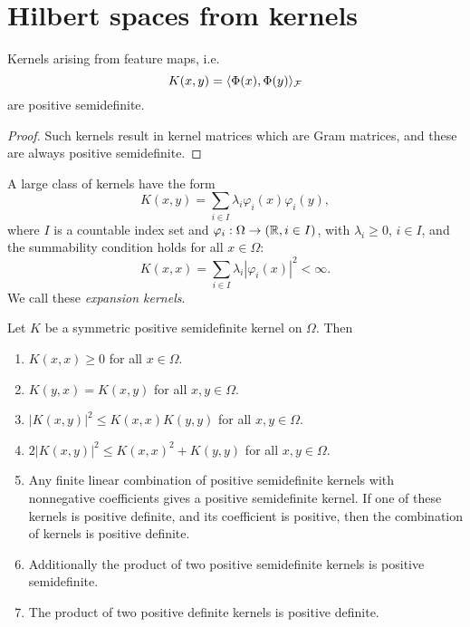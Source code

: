 \documentclass[../lecture-notes.tex]{subfiles}
\begin{document}
\section{Hilbert spaces from kernels} %
\begin{theorem} %
\label{thm:28}
Kernels arising from feature maps, i.e.
\[
	K(x, y) = \langle \Phi(x), \Phi(y) \rangle_{\mathcal{F}}
\]
are positive semidefinite.
\end{theorem}
\begin{proof}
Such kernels result in kernel matrices which are Gram matrices, and these are always positive semidefinite.
\end{proof}
\begin{remark}
A large class of kernels have the form
\[
	K(x, y) = \sum_{i \in I} \lambda_i \varphi_i(x) \varphi_i(y),
\]
where $I$ is a countable index set and $\varphi_i : \Omega \to (\mathbb{R}, i \in I)$, with $\lambda_i \geq 0$, $i \in I$, and the summability condition holds for all $x \in \Omega$:
\[
	K(x, x) = \sum_{i \in I} \lambda_i |\varphi_i(x)|^2 < \infty.
\]
We call these \emph{expansion kernels}.
\end{remark}
\begin{theorem} %
\label{thm:29}
Let $K$ be a symmetric positive semidefinite kernel on $\Omega$. Then
\begin{enumerate}
\item\label{thm:29-1}$K(x, x) \geq 0$ for all $x \in \Omega$.
\item\label{thm:29-2} $K(y, x) = K(x, y)$ for all $x, y \in \Omega$.
\item\label{thm:29-3} $|K(x, y)|^2 \leq K(x, x) K(y, y)$ for all $x, y \in \Omega$.
\item\label{thm:29-4} $2|K(x, y)|^2 \leq K(x, x)^2 + K(y, y)$ for all $x, y \in \Omega$.
\item\label{thm:29-5} Any finite linear combination of positive semidefinite kernels with nonnegative coefficients gives a positive semidefinite kernel. If one of these kernels is positive definite, and its coefficient is positive, then the combination of kernels is positive definite.
\item\label{thm:29-6} Additionally the product of two positive semidefinite kernels is positive semidefinite.
\item\label{thm:29-7} The product of two positive definite kernels is positive definite.
\end{enumerate}
\end{theorem}
\end{document}
